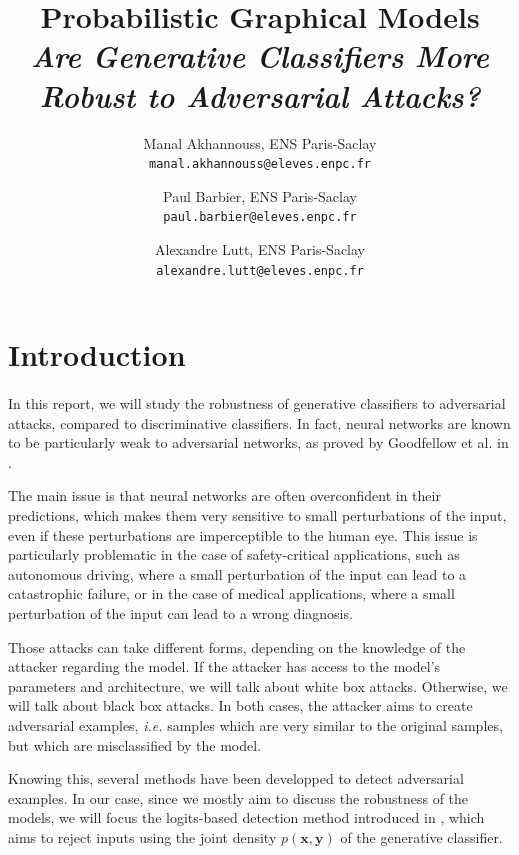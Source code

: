 \documentclass[10pt,twocolumn,letterpaper]{article}
\begin{document}
\title{\LARGE Probabilistic Graphical Models \\ \textit{Are Generative Classiﬁers More Robust to Adversarial Attacks?}}

\author{Manal Akhannouss, ENS Paris-Saclay\\
{\tt\small manal.akhannouss@eleves.enpc.fr}
\and
Paul Barbier, ENS Paris-Saclay\\
{\tt\small paul.barbier@eleves.enpc.fr}
\and
Alexandre Lutt, ENS Paris-Saclay\\
{\tt\small alexandre.lutt@eleves.enpc.fr}
}
\maketitle


\section{Introduction}
\label{sec:intro}

\paragraph{} In this report, we will study the robustness of generative classifiers to adversarial attacks, compared to discriminative classifiers. In fact, neural networks are known to be particularly weak to adversarial networks, as proved by Goodfellow et al. in \cite{fast_gradient_sign}. 
 
The main issue is that neural networks are often overconfident in their predictions, which makes them very sensitive to small perturbations of the input, even if these perturbations are imperceptible to the human eye. This issue is particularly problematic in the case of safety-critical applications, such as autonomous driving, where a small perturbation of the input can lead to a catastrophic failure, or in the case of medical applications, where a small perturbation of the input can lead to a wrong diagnosis. 

Those attacks can take different forms, depending on the knowledge of the attacker regarding the model. If the attacker has access to the model's parameters and architecture, we will talk about white box attacks. Otherwise, we will talk about black box attacks. In both cases, the attacker aims to create adversarial examples, \textit{i.e.} samples which are very similar to the original samples, but which are misclassified by the model. 

Knowing this, several methods have been developped to detect adversarial examples. In our case, since we mostly aim to discuss the robustness of the models, we will focus the logits-based detection method introduced in \cite{main_paper}, which aims to reject inputs using the joint density $p(\bm{x}, \bm{y})$ of the generative classifier.
\end{document}
